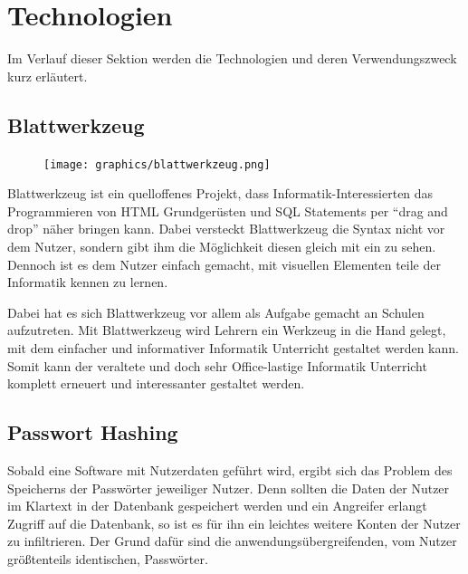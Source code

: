 \section{Technologien}
\label{sec:technology}
Im Verlauf dieser Sektion werden die Technologien und deren Verwendungszweck
kurz erläutert.

\subsection{Blattwerkzeug}
\label{sec:blattwerkzeug}

\begin{figure}
	\texttt{[image: graphics/blattwerkzeug.png]}
\end{figure}


Blattwerkzeug ist ein quelloffenes Projekt, dass Informatik-Interessierten das Programmieren von \gls{HTML} Grundgerüsten und SQL Statements per \enquote{drag and drop} näher bringen kann. Dabei versteckt Blattwerkzeug die Syntax nicht vor dem Nutzer, sondern gibt ihm die Möglichkeit diesen gleich mit ein zu sehen. Dennoch ist es dem Nutzer einfach gemacht, mit visuellen Elementen teile der Informatik kennen zu lernen.

Dabei hat es sich Blattwerkzeug vor allem als Aufgabe gemacht an Schulen aufzutreten. Mit Blattwerkzeug wird Lehrern ein Werkzeug in die Hand gelegt, mit dem einfacher und informativer Informatik Unterricht gestaltet werden kann. Somit kann der veraltete und doch sehr Office-lastige Informatik Unterricht komplett erneuert und interessanter gestaltet werden.

\subsection{Passwort Hashing}
\label{sec:password_hashing}

Sobald eine Software mit Nutzerdaten geführt wird, ergibt sich das Problem des Speicherns der Passwörter jeweiliger Nutzer.
Denn sollten die Daten der Nutzer im Klartext in der Datenbank gespeichert werden und ein Angreifer erlangt Zugriff auf die Datenbank, so ist es für ihn ein leichtes weitere Konten der Nutzer zu infiltrieren. Der Grund dafür sind die anwendungsübergreifenden, vom Nutzer größtenteils identischen, Passwörter.


